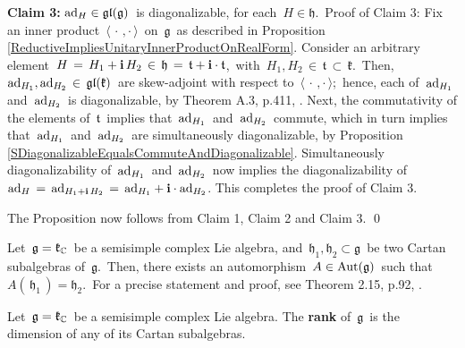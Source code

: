 \vskip 0.3cm
\noindent
\textbf{Claim 3:}\;\; $\textnormal{ad}_{H} \in \mathfrak{gl}(\mathfrak{g})$\, is diagonalizable,
for each \,$H \in \mathfrak{h}$.\,
\vskip 0.1cm
\noindent
Proof of Claim 3:\;
Fix an inner product \,$\langle\,\cdot\,,\cdot\,\rangle$\, on \,$\mathfrak{g}$\,
as described in Proposition \ref{ReductiveImpliesUnitaryInnerProductOnRealForm}.
Consider an arbitrary element
\,$H \,=\, H_{1} + \mathbf{i}\,H_{2} \,\in\, \mathfrak{h} \,=\, \mathfrak{t} + \mathbf{i}\cdot\mathfrak{t}$,\,
with \,$H_{1}, H_{2} \,\in\, \mathfrak{t} \,\subset\, \mathfrak{k}$.\,
Then, \,$\textnormal{ad}_{H_{1}}, \textnormal{ad}_{H_{2}} \,\in\, \mathfrak{gl}(\mathfrak{k})$\,
are skew-adjoint with respect to
\,$\langle\,\cdot\,,\cdot\,\rangle$;\,
hence, each of \,$\textnormal{ad}_{H_{1}}$\, and \,$\textnormal{ad}_{H_{2}}$\, is diagonalizable,
by Theorem A.3, p.411, \cite{Hall2015}.
Next, the commutativity of the elements of \,$\mathfrak{t}$\,
implies that \,$\textnormal{ad}_{H_{1}}$\, and \,$\textnormal{ad}_{H_{2}}$\, commute,
which in turn implies that
\,$\textnormal{ad}_{H_{1}}$\, and \,$\textnormal{ad}_{H_{2}}$\,
are simultaneously diagonalizable,
by Proposition \ref{SDiagonalizableEqualsCommuteAndDiagonalizable}.
Simultaneously diagonalizability of
\,$\textnormal{ad}_{H_{1}}$\, and \,$\textnormal{ad}_{H_{2}}$\,
now implies the diagonalizability of
\,$\textnormal{ad}_{H} \,=\, \textnormal{ad}_{H_{1}+\mathbf{i}\,H_{2}} \,=\, \textnormal{ad}_{H_{1}} + \mathbf{i}\cdot\textnormal{ad}_{H_{2}}$.
This completes the proof of Claim 3.

\vskip 0.3cm
\noindent
The Proposition now follows from Claim 1, Claim 2 and Claim 3.
\qed


\vskip 0.5cm
\begin{remark}
\mbox{}
\vskip 0.05cm
\noindent
Let \,$\mathfrak{g} = \mathfrak{k}_{\mathbb{C}}$\, be a semisimple complex Lie algebra, and
\,$\mathfrak{h}_{1}, \mathfrak{h}_{2} \subset \mathfrak{g}$\,
be two Cartan subalgebras of \,$\mathfrak{g}$.\,
Then, there exists an automorphism \,$A \in \textnormal{Aut}(\mathfrak{g})$\, such that
\,$A(\,\mathfrak{h}_{1}\,) = \mathfrak{h}_{2}$.\,
For a precise statement and proof, see Theorem 2.15, p.92, \cite{Knapp1996}.
\end{remark}


\vskip 0.5cm
\begin{definition}
\mbox{}
\vskip 0.05cm
\noindent
Let \,$\mathfrak{g} = \mathfrak{k}_{\mathbb{C}}$\, be a semisimple complex Lie algebra.
The \textbf{rank} of \,$\mathfrak{g}$\, is the dimension of any of its Cartan subalgebras.
\end{definition}

